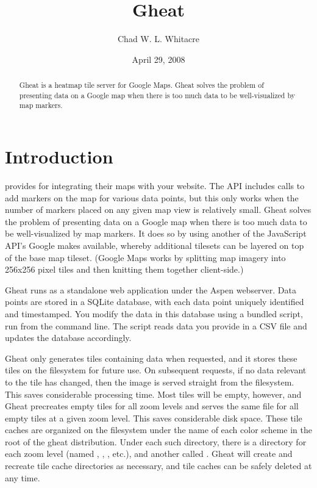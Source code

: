 \documentclass{manual}
\title{Gheat}
\author{Chad W. L. Whitacre}
\date{April 29, 2008} %
\begin{document}
\maketitle

\begin{abstract}

\noindent

Gheat is a heatmap tile server for Google Maps. Gheat solves the problem of
presenting data on a Google map when there is too much data to be
well-visualized by map markers.

\end{abstract}


\chapter{Introduction}
\label{introduction}

 provides  for integrating their maps with your
website. The API includes calls to add markers on the map for various data
points, but this only works when the number of markers placed on any given map
view is relatively small. Gheat solves the problem of presenting data on a
Google map when there is too much data to be well-visualized by map markers. It
does so by using another of the JavaScript API's Google makes available,
whereby additional tilesets can be layered on top of the base map tileset.
(Google Maps works by splitting map imagery into 256x256 pixel tiles and then
knitting them together client-side.)

Gheat runs as a standalone web application under the Aspen webserver. Data 
points are stored in a SQLite database, with each data point uniquely identified
and timestamped. You modify the data in this database using a bundled script, 
run from the command line. The script reads data you provide in a CSV file and 
updates the database accordingly.

Gheat only generates tiles containing data when requested, and it stores these
tiles on the filesystem for future use. On subsequent requests, if no data
relevant to the tile has changed, then the image is served straight from the
filesystem. This saves considerable processing time. Most tiles will be empty,
however, and Gheat precreates empty tiles for all zoom levels and serves the
same file for all empty tiles at a given zoom level. This saves considerable
disk space. These tile caches are organized on the filesystem under the name of
each color scheme in the root of the gheat distribution. Under each such
directory, there is a directory for each zoom level (named , ,
, etc.), and another called . Gheat will create and
recreate tile cache directories as necessary, and tile caches can be safely
deleted at any time.
\end{document}
